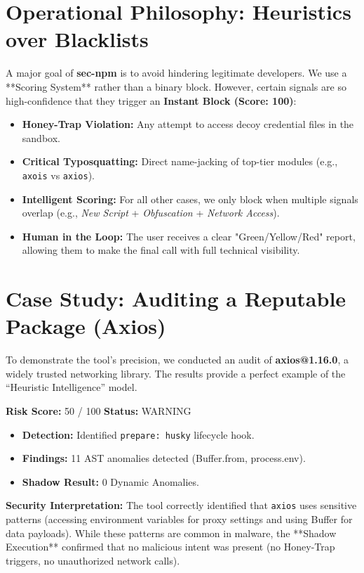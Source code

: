 \documentclass[12pt,a4paper]{article}
\begin{document}
\section{Operational Philosophy: Heuristics over Blacklists}
A major goal of \textbf{sec-npm} is to avoid hindering legitimate developers. We use a **Scoring System** rather than a binary block. However, certain signals are so high-confidence that they trigger an \textbf{Instant Block (Score: 100)}:
\begin{itemize}
    \item \textbf{Honey-Trap Violation:} Any attempt to access decoy credential files in the sandbox.
    \item \textbf{Critical Typosquatting:} Direct name-jacking of top-tier modules (e.g., \texttt{axois} vs \texttt{axios}).
    \item \textbf{Intelligent Scoring:} For all other cases, we only block when multiple signals overlap (e.g., \textit{New Script} + \textit{Obfuscation} + \textit{Network Access}).
    \item \textbf{Human in the Loop:} The user receives a clear "Green/Yellow/Red" report, allowing them to make the final call with full technical visibility.
\end{itemize}

\section{Case Study: Auditing a Reputable Package (Axios)}
To demonstrate the tool's precision, we conducted an audit of \textbf{axios@1.16.0}, a widely trusted networking library. The results provide a perfect example of the ``Heuristic Intelligence'' model.

\begin{tcolorbox}[colback=seclightblue,colframe=secblue,title=Audit Result: axios@1.16.0]
    \textbf{Risk Score:} 50 / 100 \quad \textbf{Status:} \color{orange}WARNING
    \begin{itemize}
        \item \textbf{Detection:} Identified \texttt{prepare: husky} lifecycle hook.
        \item \textbf{Findings:} 11 AST anomalies detected (Buffer.from, process.env).
        \item \textbf{Shadow Result:} 0 Dynamic Anomalies.
    \end{itemize}
\end{tcolorbox}

\textbf{Security Interpretation:} 
The tool correctly identified that \texttt{axios} uses sensitive patterns (accessing environment variables for proxy settings and using Buffer for data payloads). While these patterns are common in malware, the **Shadow Execution** confirmed that no malicious intent was present (no Honey-Trap triggers, no unauthorized network calls). 
\end{document}
